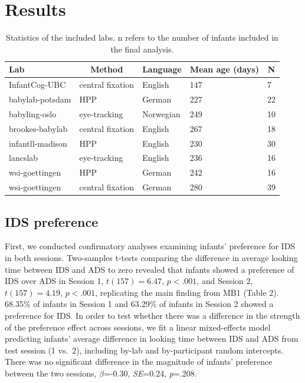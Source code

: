 \documentclass[
  english,
  man,floatsintext]{apa6}
\begin{document}
\hypertarget{results}{%
\section{Results}\label{results}}

\begin{table}[tbp]

\begin{center}
\begin{threeparttable}

\caption{\label{tab:labs}Statistics of the included labs. n refers to the number of infants included in the final analysis.}

\begin{tabular}{lllll}
\toprule
Lab & \multicolumn{1}{c}{Method} & \multicolumn{1}{c}{Language} & \multicolumn{1}{c}{Mean age (days)} & \multicolumn{1}{c}{N}\\
\midrule
InfantCog-UBC & central fixation & English & 147 & 7\\
babylab-potsdam & HPP & German & 227 & 22\\
babyling-oslo & eye-tracking & Norwegian & 249 & 10\\
brookes-babylab & central fixation & English & 267 & 18\\
infantll-madison & HPP & English & 230 & 30\\
lancslab & eye-tracking & English & 236 & 16\\
wsi-goettingen & HPP & German & 242 & 16\\
wsi-goettingen & central fixation & German & 280 & 39\\
\bottomrule
\end{tabular}

\end{threeparttable}
\end{center}

\end{table}

\hypertarget{ids-preference}{%
\subsection{IDS preference}\label{ids-preference}}

First, we conducted confirmatory analyses examining infants' preference for IDS in both sessions. Two-samples t-tests comparing the difference in average looking time between IDS and ADS to zero revealed that infants showed a preference of IDS over ADS in Session 1, \(t(157) = 6.47\), \(p < .001\), and Session 2, \(t(157) = 4.19\), \(p < .001\), replicating the main finding from MB1 (Table 2).
68.35\% of infants in Session 1 and 63.29\% of infants in Session 2 showed a preference for IDS.
In order to test whether there was a difference in the strength of the preference effect across sessions, we fit a linear mixed-effects model predicting infants' average difference in looking time between IDS and ADS from test session (1 vs.~2), including by-lab and by-participant random intercepts.
There was no significant difference in the magnitude of infants' preference between the two sessions, \(\beta\)=-0.30, \emph{SE}=0.24, \emph{p}=.208.
\end{document}
